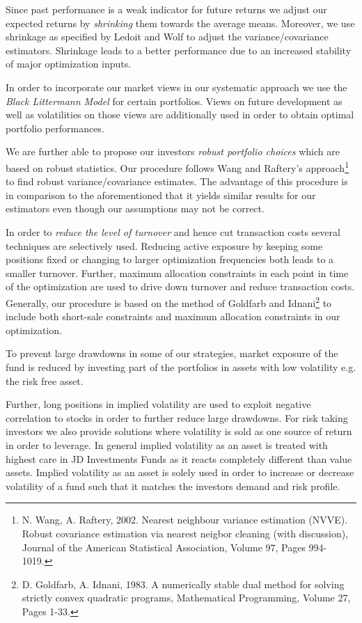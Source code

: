\documentclass[11pt, DIV=15]{scrreprt}
\begin{document}
Since past performance is a weak indicator for future returns we adjust our expected returns by \textit{shrinking} them towards the average means.
Moreover, we use shrinkage as specified by Ledoit and Wolf to adjust the variance/covariance estimators.
Shrinkage leads to a better performance due to an increased stability of major optimization inputs.

In order to incorporate our market views in our systematic approach we use the \textit{Black Littermann Model} for certain portfolios.
Views on future development as well as volatilities on those views are additionally used in order to obtain optimal portfolio performances.

We are further able to propose our investors \textit{robust portfolio choices} which are based on robust statistics.
Our procedure follows Wang and Raftery’s approach\footnote{N. Wang, A. Raftery, 2002. Nearest neighbour variance estimation (NVVE). Robust covariance estimation via nearest neigbor cleaning (with discussion), Journal of the American Statistical Association, Volume 97, Pages 994-1019.} to find robust variance/covariance estimates.
The advantage of this procedure is in comparison to the aforementioned that it yields similar results for our estimators even though our assumptions may not be correct.

In order to \textit{reduce the level of turnover} and hence cut transaction costs several techniques are selectively used.
Reducing active exposure by keeping some positions fixed or changing to larger optimization frequencies both leads to a smaller turnover.
Further, maximum allocation constraints in each point in time of the optimization are used to drive down turnover and reduce transaction costs.
Generally, our procedure is based on the method of Goldfarb and Idnani\footnote{D. Goldfarb, A. Idnani, 1983. A numerically stable dual method for solving strictly convex quadratic programs, Mathematical Programming, Volume 27, Pages 1-33.} to include both short-sale constraints and maximum allocation constraints in our optimization.

To prevent large drawdowns in some of our strategies, market exposure of the fund is reduced by investing part of the portfolios in assets with low volatility e.g. the risk free asset.

Further, long positions in implied volatility are used to exploit negative correlation to stocks in order to further reduce large drawdowns.
For risk taking investors we also provide solutions where volatility is sold as one source of return in order to leverage.
In general implied volatility as an asset is treated with highest care in JD Investments Funds as it reacts completely different than value assets.
Implied volatility as an asset is solely used in order to increase or decrease volatility of a fund such that it matches the investors demand and risk profile.
\end{document}

